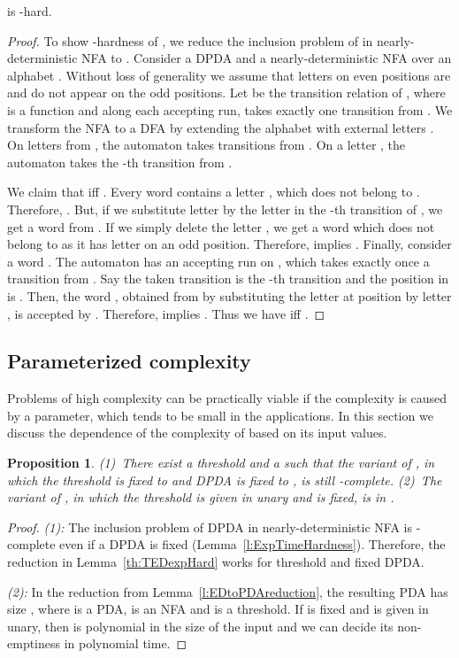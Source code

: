 \documentclass{CSML}
\newtheorem{proposition}[theorem]{Proposition}
\begin{document}
\begin{lem}
 is -hard.
\label{th:TEDexpHard}
\end{lem}
\begin{proof}
To show -hardness of , 
we reduce the inclusion problem of  in nearly-deterministic NFA to .
Consider a DPDA  and a nearly-deterministic NFA  over an alphabet .
Without loss of generality we assume that letters on even positions are  and 
do not appear on the odd positions.
Let  be the transition relation of , where  is a function
and along each accepting run,  takes exactly one transition from .
We transform the NFA  to a DFA  by extending the alphabet  with external letters .
On letters from , the automaton  takes transitions from . 
On a letter , the automaton  takes the -th transition from .


We claim that  iff 
.
Every word  contains a letter , which does not belong to . 
Therefore, .
But, if we substitute letter  by the letter in the -th transition of , we get a word from . 
If we simply delete the letter , we get a word which does not belong to  as it has letter  on an odd position.
Therefore,  implies 
. 
Finally, consider a word . The automaton  has an accepting run on , which takes exactly once a transition from .
Say the taken transition is the -th transition and the position in  is .
Then, the word , obtained from  by substituting the letter at position  by letter , is accepted by .
Therefore,  implies .
Thus we have  iff .
\end{proof}



\subsection{Parameterized complexity}
\label{sec:parametricTED}

Problems of high complexity can be practically viable if the complexity
is caused by a parameter, which tends to be small in the applications. In this section 
we discuss the dependence of the complexity of  based on its input values.

\begin{proposition}
(1)~There exist a threshold  and a   such that 
the variant of , in which the threshold is fixed to  and DPDA 
is fixed to , is still -complete.
(2)~The variant of , in which the threshold is given in unary and 
 is fixed, is in .
\end{proposition}

\begin{proof}
\noindent\emph{(1):} The inclusion problem of DPDA in nearly-deterministic NFA is
-complete even if a DPDA is fixed (Lemma~\ref{l:ExpTimeHardness}).
Therefore, the reduction in Lemma~\ref{th:TEDexpHard} works for threshold  and fixed DPDA.

\noindent\emph{(2):} In the reduction from Lemma~\ref{l:EDtoPDAreduction}, the resulting PDA has size , where  is a PDA,  is an NFA
and  is a threshold. If  is fixed and  is given in unary, then 
is polynomial in the size of the input and we can decide its non-emptiness in polynomial time.
\end{proof}
\end{document}
